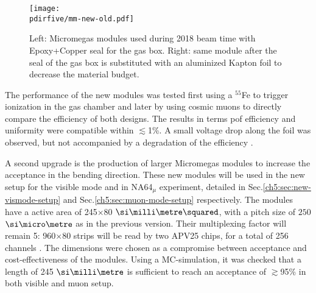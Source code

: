 \begin{figure}[bth!]
  \centering
  \texttt{[image: \\pdirfive/mm-new-old.pdf]}
  \caption[Previous version and new Micromegas design of the gas box seal]{Left: Micromegas modules used during 2018 beam time with Epoxy+Copper seal for the gas box. Right: same module after the seal of the gas box is substituted with an aluminized Kapton foil to decrease the material budget.}
  \label{fig:mm-old-new}
\end{figure}

The performance of the new modules was tested first using a $^{55}$Fe to trigger ionization in the gas chamber and later by using cosmic muons to directly compare the efficiency of both designs. The results in terms pof efficiency and uniformity were compatible within $\lesssim$1\%. A small voltage drop along the foil was observed, but not accompanied by a degradation of the efficiency \cite{philip-swork}.

A second upgrade is the production of larger Micromegas modules to increase the acceptance in the bending direction. These new modules will be used in the new setup for the visible mode and in NA64$_{\mu}$ experiment, detailed in Sec.\ref{ch5:sec:new-vismode-setup} and Sec.\ref{ch5:sec:muon-mode-setup} respectively. The modules have a active area of 245$\times$80 $\mms$, with a pitch size of $250$ $\mum$ as in the previous version. Their multiplexing factor will remain 5:  960$\times$80 strips will be read by two APV25 chips, for a total of 256 channels \cite{apv-useguide}. The dimensions were chosen as a compromise between acceptance and cost-effectiveness of the modules. Using a MC-simulation, it was checked that a length of 245 $\mmi$ is sufficient to reach an acceptance of $\gtrsim$95\% in both visible and muon setup.

